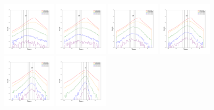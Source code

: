 \documentclass[12pt,prd]{article}
\begin{document}
\begin{figure}[h!]
\includegraphics[width=0.24\textwidth]{../figures/scanning_plotsgaiascan_l99_0_b50_2_ra224_7_dec60_6_npy_4.pdf}
\includegraphics[width=0.24\textwidth]{../figures/scanning_plotsgaiascan_l99_0_b50_2_ra224_7_dec60_6_npy_5.pdf}
\includegraphics[width=0.24\textwidth]{../figures/scanning_plotsgaiascan_l99_0_b50_2_ra224_7_dec60_6_npy_6.pdf}
\includegraphics[width=0.24\textwidth]{../figures/scanning_plotsgaiascan_l99_0_b50_2_ra224_7_dec60_6_npy_7.pdf}
\includegraphics[width=0.24\textwidth]{../figures/scanning_plotsgaiascan_l99_0_b50_2_ra224_7_dec60_6_npy_8.pdf}
\includegraphics[width=0.24\textwidth]{../figures/scanning_plotsgaiascan_l99_0_b50_2_ra224_7_dec60_6_npy_9.pdf}

\end{figure}
\end{document}
